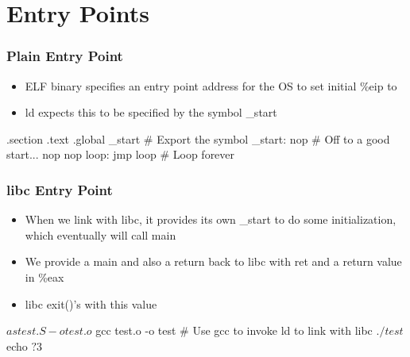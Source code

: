 \documentclass[11pt,xcolor=dvipsnames]{beamer}
\begin{document}
\section{Entry Points}

\begin{frame}[fragile,t]
\frametitle{Plain Entry Point}
\begin{itemize}
  \item ELF binary specifies an entry point address for the OS to set initial {\ttfamily \%eip} to
  \item {\ttfamily ld} expects this to be specified by the symbol {\ttfamily \_start}
\end{itemize}
\pause
\begin{gascode}
.section .text
.global _start    # Export the symbol
_start:
  nop             # Off to a good start...
  nop
  nop
  loop: jmp loop  # Loop forever
\end{gascode}
\end{frame}

\begin{frame}[fragile,t]
\frametitle{{\ttfamily libc} Entry Point}
\begin{itemize}
  \item When we link with {\ttfamily libc}, it provides its own {\ttfamily \_start} to do some initialization, which eventually will call {\ttfamily main}
  \item We provide a {\ttfamily main} and also a return back to libc with {\ttfamily ret} and a return value in {\ttfamily \%eax}
  \item libc {\ttfamily exit()'s} with this value
\end{itemize}
\pause
{}
\begin{textcode}
$ as test.S -o test.o
$ gcc test.o -o test    # Use gcc to invoke ld to link with libc
$ ./test
$ echo $?
3
$
\end{textcode}
\end{frame}
\end{document}
